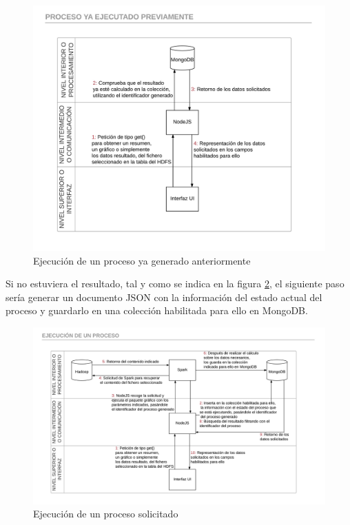 \begin{figure}
	\centering
	\includegraphics[width=1\linewidth]{imagenes/Proceso_ya_ejecutado_previamente}
	\caption{Ejecución de un proceso ya generado anteriormente}
	\label{fig:procesoyaejecutadopreviamente}
\end{figure}

Si no estuviera el resultado, tal y como se indica en la figura \ref{fig:ejecuciondeunproceso}, el siguiente paso sería generar un documento JSON con la información del estado actual del proceso y guardarlo en una colección habilitada para ello en MongoDB.

\begin{figure}
	\centering
	\includegraphics[width=1\linewidth]{imagenes/Ejecucion_de_un_proceso}
	\caption{Ejecución de un proceso solicitado}
	\label{fig:ejecuciondeunproceso}
\end{figure}

